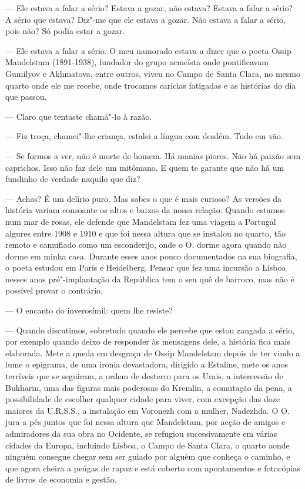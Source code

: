 --- Ele estava a falar a sério? Estava a gozar, não estava? Estava a falar
  a sério? A sério que estava? Diz"-me que ele estava a gozar. Não estava
  a falar a sério, pois não? Só podia estar a gozar.

--- Ele estava a falar a sério. O meu namorado estava a dizer que o poeta
  Ossip Mandelstam (1891-1938), fundador do grupo acmeísta onde
  pontificavam Gumilyov e Akhmatova, entre outros, viveu no Campo de
  Santa Clara, no mesmo quarto onde ele me recebe, onde trocamos
  carícias fatigadas e as histórias do dia que passou.

--- Claro que tentaste chamá"-lo à razão.

--- Fiz troça, chamei"-lhe criança, estalei a língua com desdém. Tudo em
  vão.

--- Se formos a ver, não é morte de homem. Há manias piores. Não há paixão
  sem caprichos. Isso não faz dele um mitômano. E quem te garante que
  não há um fundinho de verdade naquilo que diz?

--- Achas? É um delírio puro. Mas sabes o que é mais
curioso? As versões da história variam consoante os altos e baixos da
nossa relação. Quando estamos num mar de rosas, ele defende que
Mandelstam fez uma viagem a Portugal algures entre 1908 e 1910 e que foi
nessa altura que se instalou no quarto, tão remoto e camuflado como um
esconderijo, onde o
O. dorme agora quando não dorme em minha casa. Durante esses anos pouco
documentados na sua biografia, o poeta estudou em Paris e Heidelberg.
Pensar que fez uma incursão a Lisboa nesses anos pré"-implantação da
República tem o seu quê de barroco, mas não é possível provar o
contrário.

--- O encanto do inverosímil: quem lhe resiste?

--- Quando discutimos, sobretudo quando ele percebe que estou zangada a
  sério, por exemplo quando deixo de responder às mensagens dele, a
  história fica mais elaborada. Mete a queda em desgraça de Ossip
  Mandelstam depois de ter vindo a lume o epigrama, de uma ironia
  devastadora, dirigido a Estaline, mete os anos terríveis que se
  seguiram, a ordem de desterro para os Urais, a intercessão de
  Bukharin, uma das figuras mais poderosas do Kremlin, a comutação da
  pena, a possibilidade de escolher qualquer cidade para viver, com
  excepção das doze maiores da U.R.S.S., a instalação em Voronezh com a
  mulher, Nadezhda. O O. jura a pés juntos que foi nessa altura que
  Mandelstam, por acção de amigos e admiradores da sua obra no Ocidente,
  se refugiou sucessivamente em várias cidades da Europa, incluindo
  Lisboa, o Campo de Santa Clara, o quarto aonde ninguém consegue chegar
  sem ser guiado por alguém que conheça o caminho, e que agora cheira a
  peúgas de rapaz e está coberto com apontamentos e fotocópias de livros
  de economia e gestão.

